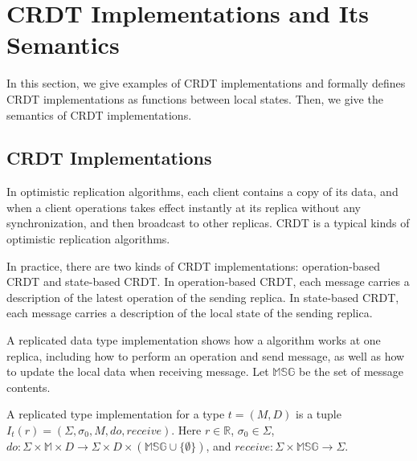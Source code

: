 
\section{CRDT Implementations and Its Semantics}
\label{sec:CRDT implementations and its semantics} 

In this section, we give examples of CRDT implementations and formally defines CRDT implementations as functions between local states. Then, we give the semantics of CRDT implementations. 


\subsection{CRDT Implementations}
\label{subsec:CRDT implementations} 

In optimistic replication algorithms, each client contains a copy of its data, and when a client operations takes effect instantly at its replica without any synchronization, and then broadcast to other replicas. CRDT is a typical kinds of optimistic replication algorithms. 






In practice, there are two kinds of CRDT implementations: operation-based CRDT and state-based CRDT. In operation-based CRDT, each message carries a description of the latest operation of the sending replica. In state-based CRDT, each message carries a description of the local state of the sending replica.





A replicated data type implementation shows how a algorithm works at one replica, including how to perform an operation and send message, as well as how to update the local data when receiving message. Let $\mathbb{MSG}$ be the set of message contents.

\begin{definition}
\label{definition:replicated type implementation}
A replicated type implementation for a type $t = (M,D)$ is a tuple $I_t(r) = (\Sigma, \sigma_0, M, \mathit{do},\mathit{receive})$. Here $r \in \mathbb{R}$, $\sigma_0 \in \Sigma$, $\mathit{do}:\Sigma \times \mathbb{M} \times D \rightarrow \Sigma \times D \times (\mathbb{MSG} \cup \{ \emptyset \} )$, and $\mathit{receive}: \Sigma \times \mathbb{MSG} \rightarrow \Sigma$.
\end{definition}

